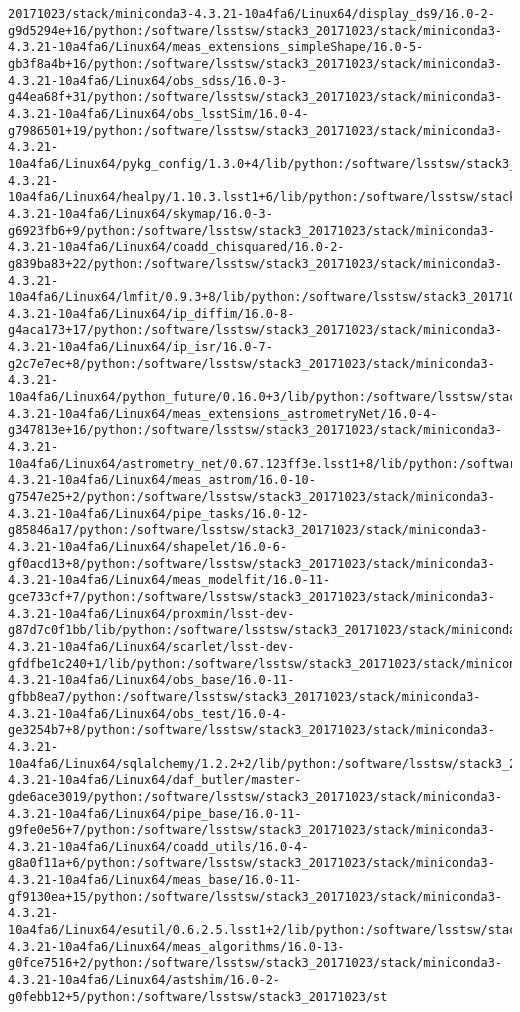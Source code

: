 \begin{verbatim}
20171023/stack/miniconda3-4.3.21-10a4fa6/Linux64/display_ds9/16.0-2-g9d5294e+16/python:/software/lsstsw/stack3_20171023/stack/miniconda3-4.3.21-10a4fa6/Linux64/meas_extensions_simpleShape/16.0-5-gb3f8a4b+16/python:/software/lsstsw/stack3_20171023/stack/miniconda3-4.3.21-10a4fa6/Linux64/obs_sdss/16.0-3-g44ea68f+31/python:/software/lsstsw/stack3_20171023/stack/miniconda3-4.3.21-10a4fa6/Linux64/obs_lsstSim/16.0-4-g7986501+19/python:/software/lsstsw/stack3_20171023/stack/miniconda3-4.3.21-10a4fa6/Linux64/pykg_config/1.3.0+4/lib/python:/software/lsstsw/stack3_20171023/stack/miniconda3-4.3.21-10a4fa6/Linux64/healpy/1.10.3.lsst1+6/lib/python:/software/lsstsw/stack3_20171023/stack/miniconda3-4.3.21-10a4fa6/Linux64/skymap/16.0-3-g6923fb6+9/python:/software/lsstsw/stack3_20171023/stack/miniconda3-4.3.21-10a4fa6/Linux64/coadd_chisquared/16.0-2-g839ba83+22/python:/software/lsstsw/stack3_20171023/stack/miniconda3-4.3.21-10a4fa6/Linux64/lmfit/0.9.3+8/lib/python:/software/lsstsw/stack3_20171023/stack/miniconda3-4.3.21-10a4fa6/Linux64/ip_diffim/16.0-8-g4aca173+17/python:/software/lsstsw/stack3_20171023/stack/miniconda3-4.3.21-10a4fa6/Linux64/ip_isr/16.0-7-g2c7e7ec+8/python:/software/lsstsw/stack3_20171023/stack/miniconda3-4.3.21-10a4fa6/Linux64/python_future/0.16.0+3/lib/python:/software/lsstsw/stack3_20171023/stack/miniconda3-4.3.21-10a4fa6/Linux64/meas_extensions_astrometryNet/16.0-4-g347813e+16/python:/software/lsstsw/stack3_20171023/stack/miniconda3-4.3.21-10a4fa6/Linux64/astrometry_net/0.67.123ff3e.lsst1+8/lib/python:/software/lsstsw/stack3_20171023/stack/miniconda3-4.3.21-10a4fa6/Linux64/meas_astrom/16.0-10-g7547e25+2/python:/software/lsstsw/stack3_20171023/stack/miniconda3-4.3.21-10a4fa6/Linux64/pipe_tasks/16.0-12-g85846a17/python:/software/lsstsw/stack3_20171023/stack/miniconda3-4.3.21-10a4fa6/Linux64/shapelet/16.0-6-gf0acd13+8/python:/software/lsstsw/stack3_20171023/stack/miniconda3-4.3.21-10a4fa6/Linux64/meas_modelfit/16.0-11-gce733cf+7/python:/software/lsstsw/stack3_20171023/stack/miniconda3-4.3.21-10a4fa6/Linux64/proxmin/lsst-dev-g87d7c0f1bb/lib/python:/software/lsstsw/stack3_20171023/stack/miniconda3-4.3.21-10a4fa6/Linux64/scarlet/lsst-dev-gfdfbe1c240+1/lib/python:/software/lsstsw/stack3_20171023/stack/miniconda3-4.3.21-10a4fa6/Linux64/obs_base/16.0-11-gfbb8ea7/python:/software/lsstsw/stack3_20171023/stack/miniconda3-4.3.21-10a4fa6/Linux64/obs_test/16.0-4-ge3254b7+8/python:/software/lsstsw/stack3_20171023/stack/miniconda3-4.3.21-10a4fa6/Linux64/sqlalchemy/1.2.2+2/lib/python:/software/lsstsw/stack3_20171023/stack/miniconda3-4.3.21-10a4fa6/Linux64/daf_butler/master-gde6ace3019/python:/software/lsstsw/stack3_20171023/stack/miniconda3-4.3.21-10a4fa6/Linux64/pipe_base/16.0-11-g9fe0e56+7/python:/software/lsstsw/stack3_20171023/stack/miniconda3-4.3.21-10a4fa6/Linux64/coadd_utils/16.0-4-g8a0f11a+6/python:/software/lsstsw/stack3_20171023/stack/miniconda3-4.3.21-10a4fa6/Linux64/meas_base/16.0-11-gf9130ea+15/python:/software/lsstsw/stack3_20171023/stack/miniconda3-4.3.21-10a4fa6/Linux64/esutil/0.6.2.5.lsst1+2/lib/python:/software/lsstsw/stack3_20171023/stack/miniconda3-4.3.21-10a4fa6/Linux64/meas_algorithms/16.0-13-g0fce7516+2/python:/software/lsstsw/stack3_20171023/stack/miniconda3-4.3.21-10a4fa6/Linux64/astshim/16.0-2-g0febb12+5/python:/software/lsstsw/stack3_20171023/st
\end{verbatim}
